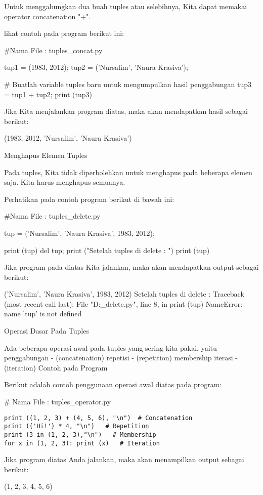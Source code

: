 Untuk menggabungkan dua buah tuples atau selebihnya, Kita dapat memakai operator concatenation "+".

lihat contoh pada program berikut ini:

#Nama File : tuples_concat.py

tup1 = (1983, 2012);
tup2 = ('Nursalim', 'Naura Krasiva');

# Buatlah variable tuples baru untuk mengumpulkan hasil penggabungan
tup3 = tup1 + tup2;
print (tup3)

Jika Kita menjalankan program diatas, maka akan mendapatkan hasil sebagai berikut:

(1983, 2012, 'Nursalim', 'Naura Krasiva')

Menghapus Elemen Tuples


Pada tuples, Kita tidak diperbolehkan untuk menghapus pada beberapa elemen saja. Kita harus menghapus semuanya.

Perhatikan pada contoh program berikut di bawah ini:

#Nama File : tuples_delete.py

tup = ('Nursalim', 'Naura Krasiva', 1983, 2012);

print (tup)
del tup;
print ("Setelah tuples di delete : ")
print (tup)


Jika program pada diatas Kita jalankan, maka akan mendapatkan output sebagai berikut: 

('Nursalim', 'Naura Krasiva', 1983, 2012)
Setelah tuples di delete : 
Traceback (most recent call last):
  File "D:\python\tuples_delete.py", line 8, in 
    print (tup)
NameError: name 'tup' is not defined

Operasi Dasar Pada Tuples


Ada beberapa operasi awal pada tuples yang sering kita pakai, yaitu
penggabungan - (concatenation)
repetisi - (repetition)
membership
iterasi - (iteration)
Contoh pada Program

Berikut adalah contoh penggunaan operasi awal diatas pada program:

\# Nama File : tuples_operator.py
\begin{verbatim}
print ((1, 2, 3) + (4, 5, 6), "\n")  # Concatenation
print (('Hi!') * 4, "\n")   # Repetition
print (3 in (1, 2, 3),"\n")   # Membership
for x in (1, 2, 3): print (x)   # Iteration
\end{verbatim}
Jika program diatas Anda jalankan, maka akan menampilkan output sebagai berikut:

(1, 2, 3, 4, 5, 6) 

